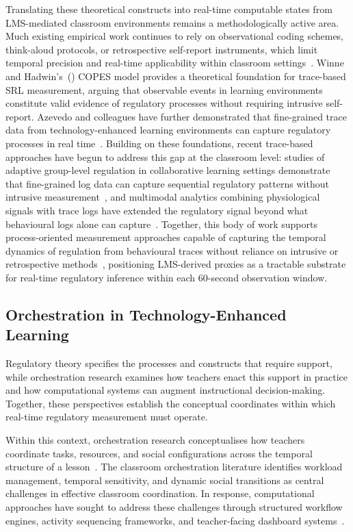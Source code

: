 \documentclass[preprint,12pt,authoryear]{elsarticle}
\begin{document}
Translating these theoretical constructs into real-time computable states from LMS-mediated classroom environments remains a methodologically active area. Much existing empirical work continues to rely on observational coding schemes, think-aloud protocols, or retrospective self-report instruments, which limit temporal precision and real-time applicability within classroom settings~\citep{malmberg2017}. Winne and Hadwin's~(\citeyear{winne1998}) COPES model provides a theoretical foundation for trace-based SRL measurement, arguing that observable events in learning environments constitute valid evidence of regulatory processes without requiring intrusive self-report. Azevedo and colleagues have further demonstrated that fine-grained trace data from technology-enhanced learning environments can capture regulatory processes in real time~\citep{azevedo2013}. Building on these foundations, recent trace-based approaches have begun to address this gap at the classroom level: studies of adaptive group-level regulation in collaborative learning settings demonstrate that fine-grained log data can capture sequential regulatory patterns without intrusive measurement~\citep{malmberg2022}, and multimodal analytics combining physiological signals with trace logs have extended the regulatory signal beyond what behavioural logs alone can capture~\citep{nguyen2023, jarvela2023a}. Together, this body of work supports process-oriented measurement approaches capable of capturing the temporal dynamics of regulation from behavioural traces without reliance on intrusive or retrospective methods~\citep{jarvela2021, jarvela2021b}, positioning LMS-derived proxies as a tractable substrate for real-time regulatory inference within each 60-second observation window.

\subsection{Orchestration in Technology-Enhanced Learning}

Regulatory theory specifies the processes and constructs that require support, while orchestration research examines how teachers enact this support in practice and how computational systems can augment instructional decision-making. Together, these perspectives establish the conceptual coordinates within which real-time regulatory measurement must operate.

Within this context, orchestration research conceptualises how teachers coordinate tasks, resources, and social configurations across the temporal structure of a lesson~\citep{feng2023, olsen2021}. The classroom orchestration literature identifies workload management, temporal sensitivity, and dynamic social transitions as central challenges in effective classroom coordination. In response, computational approaches have sought to address these challenges through structured workflow engines, activity sequencing frameworks, and teacher-facing dashboard systems~\citep{amarasinghe2020, martinezmaldonado2019}.
\end{document}
